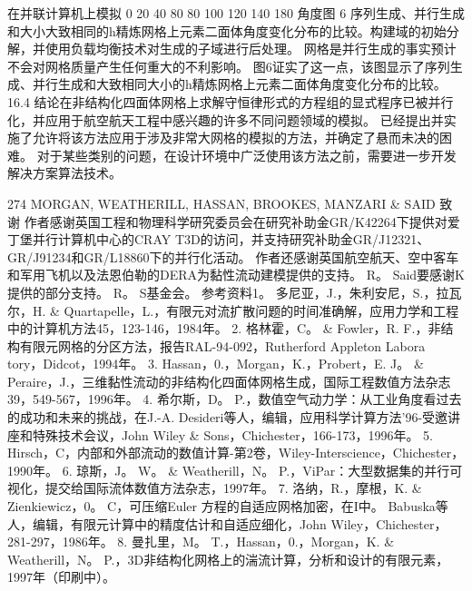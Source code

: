\documentclass[UTF8,11pt,a4paper,openany,fontset=fandol]{ctexbook}
\begin{document}
在并联计算机上模拟 0 20 40 80 80 100 120 140 180 角度图 6 序列生成、并行生成和大小大致相同的h精炼网格上元素二面体角度变化分布的比较。构建域的初始分解，并使用负载均衡技术对生成的子域进行后处理。 网格是并行生成的事实预计不会对网格质量产生任何重大的不利影响。 图6证实了这一点，该图显示了序列生成、并行生成和大致相同大小的h精炼网格上元素二面体角度变化分布的比较。 16.4 结论在非结构化四面体网格上求解守恒律形式的方程组的显式程序已被并行化，并应用于航空航天工程中感兴趣的许多不同问题领域的模拟。 已经提出并实施了允许将该方法应用于涉及非常大网格的模拟的方法，并确定了悬而未决的困难。 对于某些类别的问题，在设计环境中广泛使用该方法之前，需要进一步开发解决方案算法技术。

274 MORGAN, WEATHERILL, HASSAN, BROOKES, MANZARI \& SAID 致谢 作者感谢英国工程和物理科学研究委员会在研究补助金GR/K42264下提供对爱丁堡并行计算机中心的CRAY T3D的访问，并支持研究补助金GR/J12321、GR/J91234和GR/L18860下的并行化活动。 作者还感谢英国航空航天、空中客车和军用飞机以及法恩伯勒的DERA为黏性流动建模提供的支持。 R。 Said要感谢K提供的部分支持。 R。 S基金会。 参考资料1。 多尼亚，J.，朱利安尼，S.，拉瓦尔，H. \& Quartapelle，L.，有限元对流扩散问题的时间准确解，应用力学和工程中的计算机方法45，123-146，1984年。 2. 格林霍，C。 \& Fowler，R. F.，非结构有限元网格的分区方法，报告RAL-94-092，Rutherford Appleton Labora tory，Didcot，1994年。 3. Hassan，0.，Morgan，K.，Probert，E. J。 \& Peraire，J.，三维黏性流动的非结构化四面体网格生成，国际工程数值方法杂志39，549-567，1996年。 4. 希尔斯，D。 P.，数值空气动力学：从工业角度看过去的成功和未来的挑战，在J.-A. Desideri等人，编辑，应用科学计算方法'96-受邀讲座和特殊技术会议，John Wiley \& Sons，Chichester，166-173，1996年。 5. Hirsch，C，内部和外部流动的数值计算-第2卷，Wiley-Interscience，Chichester，1990年。 6. 琼斯，J。 W。 \& Weatherill，N。 P.，ViPar：大型数据集的并行可视化，提交给国际流体数值方法杂志，1997年。 7. 洛纳，R.，摩根，K. \& Zienkiewicz，0。 C，可压缩Euler 方程的自适应网格加密，在I中。 Babuska等人，编辑，有限元计算中的精度估计和自适应细化，John Wiley，Chichester，281-297，1986年。 8. 曼扎里，M。 T.，Hassan，0.，Morgan，K. \& Weatherill，N。 P.，3D非结构化网格上的湍流计算，分析和设计的有限元素，1997年（印刷中）。
\end{document}
